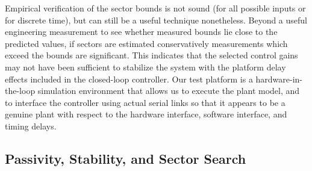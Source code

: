 Empirical verification of the sector bounds is not sound (for all possible
inputs or for discrete time), but can still be a useful technique nonetheless.
Beyond a useful engineering measurement to see whether measured bounds lie
close to the predicted values, if sectors are estimated conservatively
measurements which exceed the bounds are significant.  This indicates that the
selected control gains may not have been sufficient to stabilize the system
with the platform delay effects included in the closed-loop controller.  Our 
test platform is a hardware-in-the-loop simulation environment that allows us to
execute the plant model, and to interface the controller using actual serial links
so that it appears to be a genuine plant with respect to the hardware interface, 
software interface, and timing delays.

\subsection{Passivity, Stability, and Sector Search}

